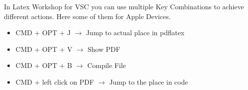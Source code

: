 %
%

\begin{tcolorbox}[red,title={Hinweis}]
In Latex Workshop for VSC you can use multiple Key Combinations to achieve different actions. Here some of them for Apple Devices.
\end{tcolorbox}

\begin{itemize}
    \item CMD + OPT + J $\rightarrow$ Jump to actual place in pdflatex
    \item CMD + OPT + V $\rightarrow$ Show PDF
    \item CMD + OPT + B $\rightarrow$ Compile File
    \item CMD + left click on PDF $\rightarrow$ Jump to the place in code
\end{itemize}
